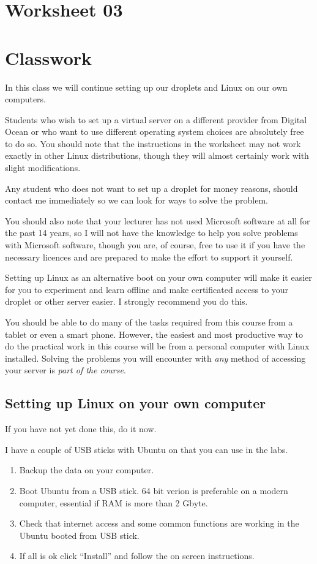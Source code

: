 \documentclass[12pt, a4paper]{article}
\begin{document}
\section*{Worksheet 03}

\section*{Classwork}
In this class we will continue setting up our droplets and Linux on our own 
computers.

Students who wish to set up a virtual server on a different provider from 
Digital Ocean or who want to use different operating system choices are 
absolutely free to do so. You should note that the instructions in the worksheet may not work exactly in other Linux distributions, though they will almost certainly work with slight modifications.

Any student who does not want to set up a droplet for money reasons, should contact me immediately so we can look for ways to solve the problem. 

You should also note that your lecturer has not used Microsoft software at all for the past 14 years, so I will not have the knowledge to help you solve problems with Microsoft software, though you are, of course, free to use it if you have the necessary licences and are prepared to make the effort to support it yourself. 

Setting up Linux as an alternative boot on your own computer will make it easier for you to experiment and learn offline and make certificated access to your droplet or other server easier. I strongly recommend you do this.

You should be able to do many of the tasks required from this course from a tablet or even a smart phone. However, the easiest and most productive way to do the practical work in this course will be from a personal computer with Linux installed. Solving the problems you will encounter with \emph{any} method of accessing your server is \emph{part of the course}.

\subsection*{Setting up Linux on your own computer}

If you have not yet done this, do it now. 

I have a couple of USB sticks with Ubuntu on that you can use in the labs.


\begin{enumerate}
 \item Backup the data on your computer.
 \item Boot Ubuntu from a USB stick. 64 bit verion is preferable on a modern computer, 
  essential if RAM is more than 2 Gbyte.
 \item Check that internet access and some common functions are working in the Ubuntu booted from USB stick.
 \item If all is ok click ``Install'' and follow the on screen instructions.
\end{enumerate}
\end{document}
